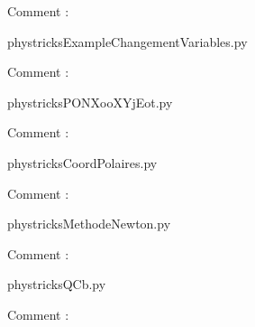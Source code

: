     Comment : 

    \clearpage
    


    \newcommand{\CaptionFigExampleChangementVariables}{<+Type your caption here+>}
    \begin{center}
        
    \end{center}
    phystricksExampleChangementVariables.py

    Comment : 

    \clearpage
    


    \newcommand{\CaptionFigPONXooXYjEot}{<+Type your caption here+>}
    \begin{center}
        
    \end{center}
    phystricksPONXooXYjEot.py

    Comment : 

    \clearpage
    


    \newcommand{\CaptionFigCoordPolaires}{<+Type your caption here+>}
    \begin{center}
        
    \end{center}
    phystricksCoordPolaires.py

    Comment : 

    \clearpage
    


    \newcommand{\CaptionFigMethodeNewton}{<+Type your caption here+>}
    \begin{center}
        
    \end{center}
    phystricksMethodeNewton.py

    Comment : 

    \clearpage
    


    \newcommand{\CaptionFigQCb}{<+Type your caption here+>}
    \begin{center}
        
    \end{center}
    phystricksQCb.py

    Comment : 

